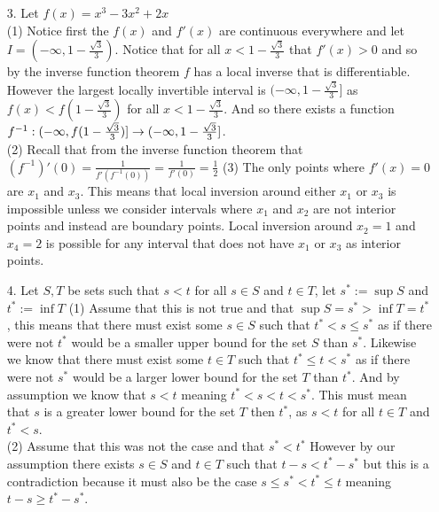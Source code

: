 \documentclass[12pt]{amsart}
\begin{document}
\begin{itemize}
   \item[3.] Let $f(x)=x^3-3x^2+2x$\\ %
      (1) Notice first the $f(x)$ and $f'(x)$ are continuous everywhere and let 
      $I=(-\infty, 1-\frac{\sqrt{3}}{3})$. Notice that for all $x<1-\frac{\sqrt{3}}{3}$ that $f'(x)>0$ and so
      by the inverse function theorem $f$ has a local inverse that is differentiable. 
      However the largest locally invertible interval is $(-\infty, 1-\frac{\sqrt{3}}{3}]$
      as $f(x)<f(1-\frac{\sqrt{3}}{3})$ for all $x<1-\frac{\sqrt{3}}{3}$. And so there 
      exists a function $f^{-1}:(-\infty,f(1-\frac{\sqrt{3}}{3})]\rightarrow(-\infty,1-\frac{\sqrt{3}}{3}]$.\\
      (2) Recall that from the inverse function theorem that $(f^{-1})'(0)=\frac{1}{f'(f^{-1}(0))}=\frac{1}{f'(0)}=\frac{1}{2}$
      (3) The only points where $f'(x)=0$ are $x_1$ and $x_3$. This means that local 
      inversion around either $x_1$ or $x_3$ is impossible unless we consider intervals where
      $x_1$ and $x_2$ are not interior points and instead are boundary points.
      Local inversion around $x_2=1$ and $x_4=2$ is possible for any interval that does 
      not have $x_1$ or $x_3$ as interior points. %

   \item[4.] Let $S,T$ be sets such that $s<t$ for all $s\in S$ and $t\in T$, let $s^*:=\sup S$ and $t^*:=\inf T$
      (1) Assume that this is not true and that $\sup S=s^*> \inf T=t^*$, 
      this means that there must exist some $s\in S$ such that $t^*<s\leq s^*$ as if there were not $t^*$ would be a
      smaller upper bound for the set $S$ than $s^*$. Likewise we know that there must exist 
      some $t\in T$ such that $t^*\leq t< s^*$ as if there were not $s^*$ would be a
      larger lower bound for the set $T$ than $t^*$. And by assumption we know that $s<t$ meaning 
      $t^*<s<t<s^*$. This must mean that $s$ is a greater lower bound for the set $T$ then $t^*$, as $s<t$ 
      for all $t\in T$ and $t^*<s$.\\
      (2) Assume that this was not the case and that $s^*<t^*$ However by our 
      assumption there exists $s\in S$ and $t\in T$ such that $t-s<t^*-s^*$ but this is a
      contradiction because it must also be the case $s\leq s^*<t^*\leq t$ meaning $t-s\geq t^*-s^*$.

\end{itemize}
\end{document}

